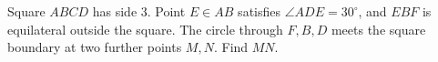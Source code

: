 Square $ABCD$ has side 3. Point $E\in AB$ satisfies $\angle ADE=30^\circ$, and $EBF$ is equilateral outside the square. The circle through $F,B,D$ meets the square boundary at two further points $M,N$. Find $MN$.

